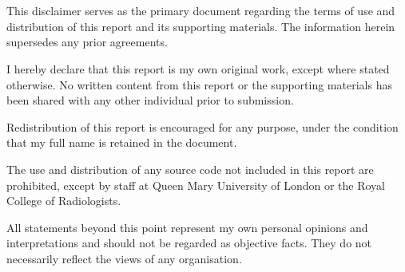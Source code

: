 \section*{}
\vspace{10pt}

This disclaimer serves as the primary document regarding the terms of use and distribution of this report and its supporting materials. The information herein supersedes any prior agreements.

I hereby declare that this report is my own original work, except where stated otherwise. No written content from this report or the supporting materials has been shared with any other individual prior to submission.

Redistribution of this report is encouraged for any purpose, under the condition that my full name is retained in the document.

The use and distribution of any source code not included in this report are prohibited, except by staff at Queen Mary University of London or the Royal College of Radiologists.

All statements beyond this point represent my own personal opinions and interpretations and should not be regarded as objective facts. They do not necessarily reflect the views of any organisation.